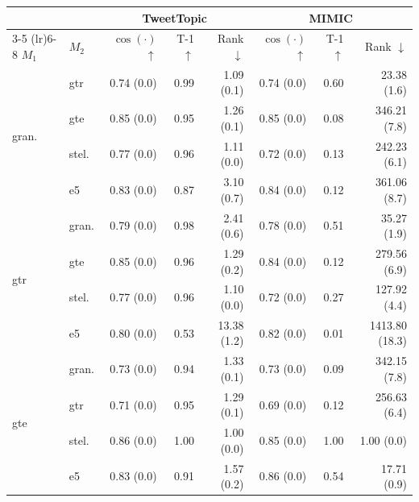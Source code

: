 

\begin{table}[t]
    \scriptsize
    \centering
    \begin{tabular}{llrrr|rrr}
        \toprule
        \multicolumn{2}{c}{} & \multicolumn{3}{c}{TweetTopic} & \multicolumn{3}{c}{MIMIC}\\
        \cmidrule(lr){3-5} \cmidrule(lr){6-8}
        $M_1$ & $M_2$ & $\cos(\cdot)$ $\uparrow$& T-1 $\uparrow$& Rank $\downarrow$& $\cos(\cdot)$ $\uparrow$& T-1 $\uparrow$& Rank $\downarrow$\\
        \midrule
        \multirow{4}{*}{gran.} & gtr & 0.74 {\tiny (0.0)} & 0.99 & 1.09 {\tiny (0.1)} & 0.74 {\tiny (0.0)} & 0.60 & 23.38 {\tiny (1.6)} \\
        & gte & 0.85 {\tiny (0.0)} & 0.95 & 1.26 {\tiny (0.1)} & 0.85 {\tiny (0.0)} & 0.08 & 346.21 {\tiny (7.8)} \\
        & stel. & 0.77 {\tiny (0.0)} & 0.96 & 1.11 {\tiny (0.0)} & 0.72 {\tiny (0.0)} & 0.13 & 242.23 {\tiny (6.1)} \\
        & e5 & 0.83 {\tiny (0.0)} & 0.87 & 3.10 {\tiny (0.7)} & 0.84 {\tiny (0.0)} & 0.12 & 361.06 {\tiny (8.7)} \\
        \midrule
        \multirow{4}{*}{gtr} & gran. & 0.79 {\tiny (0.0)} & 0.98 & 2.41 {\tiny (0.6)} & 0.78 {\tiny (0.0)} & 0.51 & 35.27 {\tiny (1.9)} \\
        & gte & 0.85 {\tiny (0.0)} & 0.96 & 1.29 {\tiny (0.2)} & 0.84 {\tiny (0.0)} & 0.12 & 279.56 {\tiny (6.9)} \\
        & stel. & 0.77 {\tiny (0.0)} & 0.96 & 1.10 {\tiny (0.0)} & 0.72 {\tiny (0.0)} & 0.27 & 127.92 {\tiny (4.4)} \\
        & e5 & 0.80 {\tiny (0.0)} & 0.53 & 13.38 {\tiny (1.2)} & 0.82 {\tiny (0.0)} & 0.01 & 1413.80 {\tiny (18.3)} \\
        \midrule
        \multirow{4}{*}{gte} & gran. & 0.73 {\tiny (0.0)} & 0.94 & 1.33 {\tiny (0.1)} & 0.73 {\tiny (0.0)} & 0.09 & 342.15 {\tiny (7.8)} \\
        & gtr & 0.71 {\tiny (0.0)} & 0.95 & 1.29 {\tiny (0.1)} & 0.69 {\tiny (0.0)} & 0.12 & 256.63 {\tiny (6.4)} \\
        & stel. & 0.86 {\tiny (0.0)} & 1.00 & 1.00 {\tiny (0.0)} & 0.85 {\tiny (0.0)} & 1.00 & 1.00 {\tiny (0.0)} \\
        & e5 & 0.83 {\tiny (0.0)} & 0.91 & 1.57 {\tiny (0.2)} & 0.86 {\tiny (0.0)} & 0.54 & 17.71 {\tiny (0.9)} \\

\end{tabular}
\end{table}

